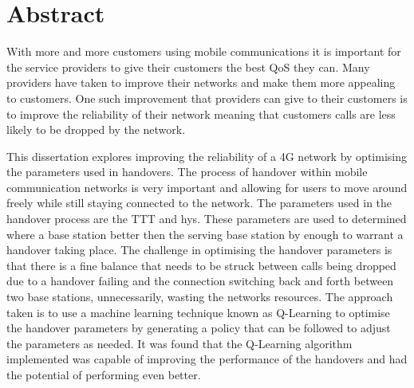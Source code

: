 \chapter*{Abstract}
With more and more customers using mobile communications it is important for the service providers to give their customers the best \ac{QoS} they can. Many providers have taken to improve their networks and make them more appealing to customers. One such improvement that providers can give to their customers is to improve the reliability of their network meaning that customers calls are less likely to be dropped by the network.

This dissertation explores improving the reliability of a 4G network by optimising the parameters used in handovers. The process of handover within mobile communication networks is very important and allowing for users to move around freely while still staying connected to the network. The parameters used in the handover process are the \ac{TTT} and \ac{hys}. These parameters are used to determined where a base station better then the serving base station by enough to warrant a handover taking place. The challenge in optimising the handover parameters is that there is a fine balance that needs to be struck between calls being dropped due to a handover failing and the connection switching back and forth between two base stations, unnecessarily, wasting the networks resources. The approach taken is to use a machine learning technique known as Q-Learning to optimise the handover parameters by generating a policy that can be followed to adjust the parameters as needed. It was found that the Q-Learning algorithm implemented was capable of improving the performance of the handovers and had the potential of performing even better.
\pagebreak